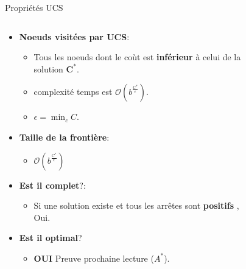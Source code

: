 \documentclass{beamer}
\begin{document}
\begin{frame}[t]{Propriétés UCS}

 \begin{columns}
   \begin{column}{0.5\textwidth}
     \begin{itemize}
       \small
     \item \textbf{Noeuds visitées par UCS}:
         \begin{itemize}
         \scriptsize
       \item Tous les noeuds dont le coùt est \textbf{inférieur} à celui de la
         solution $\mathbf{C^*}$.
       \item  complexité temps est $\mathcal{O}(b^{\frac{C^*}{\epsilon}})$.
        \item $\epsilon = \min_c C$.
         \end{itemize}
       \item \textbf{Taille de la frontière}:
         \begin{itemize}
           \scriptsize
         \item<2-> \alert{$\mathcal{O}(b^{\frac{C^*}{\epsilon}})$}
         \end{itemize}

       \item \textbf{Est il complet}?:
           \begin{itemize}
             \scriptsize
           \item Si une solution existe et tous les arrêtes sont
             \textbf{positifs} , \alert{Oui}.
           \end{itemize}
         \item \textbf{Est il optimal}?
            \begin{itemize}
              \scriptsize
            \item \textbf{\alert{OUI}} Preuve prochaine lecture  ($A^*$).
            \end{itemize}
     \end{itemize}
   \end{column}
   \begin{column}{0.5\textwidth}
     \begin{figure}[htpb]
     \begin{center}
\end{center}
\end{figure}
\end{column}
\end{columns}
\end{frame}
\end{document}
